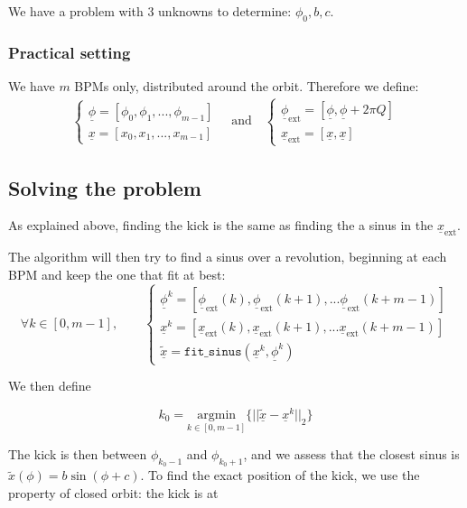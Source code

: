 \documentclass[12pt,a4paper]{article}
\renewcommand{\vec}[1]{\underline{#1}}
\begin{document}
	We have a problem with 3 unknowns to determine: $\phi_0, b, c$. 
	
	\subsubsection{Practical setting}
	
	We have $m$ BPMs only, distributed around the orbit.
	Therefore we define:
	\begin{align}
		\begin{cases}
			\vec{\phi} = [\phi_0, \phi_1, ..., \phi_{m-1}] \\
			\vec{x} = [x_0, x_1, ..., x_{m-1}]
		\end{cases} \quad \mathrm{and} \quad
		\begin{cases}
			\vec{\phi}_\mathrm{ext} = [\vec{\phi}, \vec{\phi}+2\pi Q ]\\
			\vec{x}_\mathrm{ext} = [\vec{x}, \vec{x}]
		\end{cases}
	\end{align}
	
	\subsection{Solving the problem}

	As explained above, finding the kick is the same as finding the a sinus in the $\vec{x}_\mathrm{ext}$.
	
	The algorithm will then try to find a sinus over a revolution, beginning at each BPM and keep the one that fit at best:
	\begin{equation}
		\forall k \in [0, m-1], \qquad
			\begin{cases}
				\vec{\phi}^k = [\vec{\phi}_\mathrm{ext}(k), \vec{\phi}_\mathrm{ext}(k+1), ... \vec{\phi}_\mathrm{ext}(k+m-1)]\\
				\vec{x}^k = [\vec{x}_\mathrm{ext}(k), \vec{x}_\mathrm{ext}(k+1), ... \vec{x}_\mathrm{ext}(k+m-1)]\\
				\tilde{\vec{x}} = \mathtt{fit\_sinus}(\vec{x}^k, \vec{\phi}^k)
			\end{cases}
	\end{equation}
	
	We then define
	
	\begin{equation}
		k_0 = \underset{k \in [0, m-1]}{\textrm{argmin}}\{||\tilde{\vec{x}}-\vec{x}^k||_2\}
	\end{equation}
	
	The kick is then between $\phi_{k_0-1}$ and $\phi_{k_0+1}$, and we assess that the closest sinus is $\tilde{x}(\phi) = b \sin(\phi + c) $.
	To find the exact position of the kick, we use the property of closed orbit: the kick is at 
	
\end{document}
